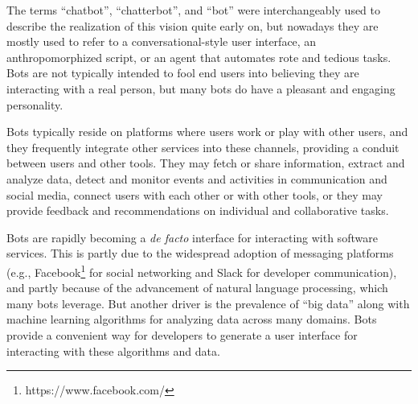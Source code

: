 \documentclass{sig-alternate}
\newcommand{\cp}[1]{\textcolor{red}{{\it [Cassie says: #1]}}}
\begin{document}
The terms ``chatbot'', ``chatterbot'', and ``bot'' were interchangeably used to describe the realization of this vision quite early on, but nowadays they are mostly used to refer to a conversational-style user interface, an anthropomorphized script, or an agent that automates rote and tedious tasks.
Bots are not typically intended to fool end users into believing they are interacting with a real person, but many bots do have a pleasant and engaging personality. 
 
Bots typically reside on platforms where users work or play with other users, and they frequently integrate other services into these channels, providing a conduit between users and other tools. 
They may fetch or share information, extract and analyze data, detect and monitor events and activities in communication and social media, connect users with each other or with other tools, or they may provide feedback and recommendations on individual and collaborative tasks. 

Bots are rapidly becoming a \emph{de facto} interface for interacting with software services. This is partly due to the widespread adoption of messaging platforms (e.g., Facebook\footnote{https://www.facebook.com/\label{Facebook}} for social networking and Slack for developer communication), and partly because of the advancement of natural language processing, which many bots leverage.
But another driver is the prevalence of ``big data'' along with machine learning algorithms for analyzing data across many domains.  Bots provide a convenient way for developers to generate a user interface for interacting with these algorithms and data. 

\end{document}
